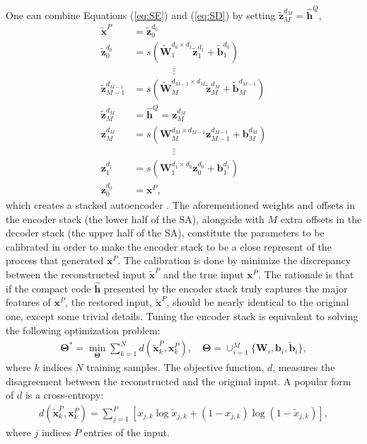 \documentclass[11pt]{article}
\newcommand{\vecEC}[1]{\boldsymbol{#1}}
\newcommand{\vecDC}[1]{\boldsymbol{\tilde{#1}}}
\newcommand{\WEC}{\vecEC{W}}                   %
\newcommand{\WEI}[3]{\WEC_{#1}^{d_{#2} \times d_{#3}}} %
\newcommand{\WDC}{\vecDC{W}}                   %
\newcommand{\WDI}[3]{\WDC_{#1}^{d_{#2} \times d_{#3}}} %
\newcommand{\bEC}{\vecEC{b}}    %
\newcommand{\bEI}[2]{\bEC_{#1}^{d_{#2}}} %
\newcommand{\bDC}{\vecDC{b}}    %
\newcommand{\bDI}[2]{\bDC_{#1}^{d_{#2}}} %
\newcommand{\xEC}{\vecEC{x}}
\newcommand{\xDC}{\vecDC{x}}
\newcommand{\hHT}{\boldsymbol{\hat{h}}}
\newcommand{\zEC}{\vecEC{z}}
\newcommand{\zDC}{\vecDC{z}}
\newcommand{\zEI}[2]{\zEC_{#1}^{d_{#2}}}
\newcommand{\zDI}[2]{\zDC_{#1}^{d_{#2}}}
\newcommand{\Par}{\boldsymbol{\Theta}}
\begin{document}
One can combine Equations (\ref{eq:SE}) and (\ref{eq:SD}) by setting $\zDI{M}{M} = \hHT^Q$,
\begin{equation} \label{eq:SA}
  \begin{split}
    \xDC^P &= \zDI{0}{0} \\
    \zDI{0  }{0  } &= s(\WDI{1  }{0  }{1  } \zDI{1  }{1  } + \bDI{1}{0  }) \\
    & \quad \quad \quad \quad \vdots \\
    \zDI{M-1}{M-1} &= s(\WDI{M  }{M-1}{M  } \zDI{M  }{M  } + \bDI{M}{M-1}) \\
    \zDI{M  }{M  } &= \hHT^Q = \zEI{M}{M} \\
    \zEI{M  }{M  } &= s(\WEI{M  }{M  }{M-1} \zEI{M-1}{M-1} + \bEI{M}{M  }) \\
    & \quad \quad \quad \quad \vdots \\
    \zEI{1  }{1  } &= s(\WEI{1  }{1  }{0  } \zEI{0  }{0  } + \bEI{1}{1  }) \\
    \zEI{0  }{0  } &= \xEC^P,
  \end{split}
\end{equation}
which creates a stacked autoencoder \citep{DL:SDA1}. The aforementioned weights and offsets in the encoder stack (the lower half of the SA), alongside with $M$ extra offsets in the decoder stack (the upper half of the SA), constitute the parameters to be calibrated in order to make the encoder stack to be a close represent of the process that generated $\xEC^P$. The calibration is done by minimize the discrepancy between the reconstructed input $\xDC^P$ and the true input $\xEC^P$. The rationale is that if the compact code $\hHT$ presented by the encoder stack truly captures the major features of $\xEC^P$, the restored input, $\xDC^P$, should be nearly identical to the original one, except some trivial details. Tuning the encoder stack is equivalent to solving the following optimization problem:
\begin{equation} \label{eq:CE}
  \begin{split}
    \Par^* = \min_{\Par} \sum_{k=1}^N{d(\xDC_k^P, \xEC_k^P)}, \quad \Par = \cup_{i=1}^M \{\WEC_i, \bEC_i, \bDC_i\},
  \end{split}
\end{equation}
where $k$ indices $N$ training samples. The objective function, $d$, measures the disagreement between the reconstructed and the original input. A popular form of $d$ is a cross-entropy:
\begin{align} \label{eq:CE}
  d(\xDC_k^P, \xEC_k^P) = \sum_{j=1}^P[{x_{j,k}\log{\tilde{x}_{j,k}} + (1 - x_{j,k})\log{(1 - \tilde{x}_{j,k})}}],
\end{align}
where $j$ indices $P$ entries of the input. 
\end{document}
